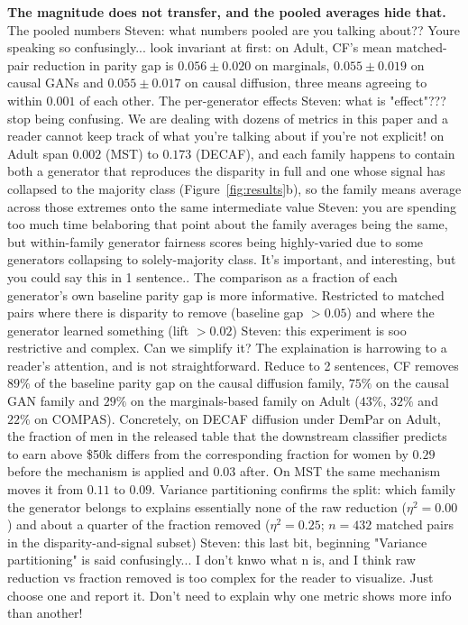 \documentclass{article}
\newcommand{\s}[1]{\textcolor{Dandelion}{Steven: #1}}
\begin{document}
\textbf{The magnitude does not transfer, and the pooled averages hide that.}
The pooled numbers \s{what numbers pooled are you talking about?? Youre speaking so confusingly...} look invariant at first: on Adult, CF's mean matched-pair
reduction in parity gap is $0.056 \pm 0.020$ on marginals, $0.055 \pm 0.019$
on causal GANs and $0.055 \pm 0.017$ on causal diffusion, three means
agreeing to within $0.001$ of each other. The per-generator effects \s{what is "effect"??? stop being confusing. We are dealing with dozens of metrics in this paper and a reader cannot keep track of what you're talking about if you're not explicit!} on Adult span $0.002$ (MST)
to $0.173$ (DECAF), and each family happens to contain both a generator
that reproduces the disparity in full and one whose signal has collapsed to
the majority class (Figure~\ref{fig:results}b), so the family means average
across those extremes onto the same intermediate value \s{you are spending too much time belaboring that point about the family averages being the same, but within-family generator fairness scores being highly-varied due to some generators collapsing to solely-majority class. It's important, and interesting, but you could say this in 1 sentence.}. The comparison as a fraction of
each generator's own baseline parity gap is more informative. Restricted to
matched pairs where there is disparity to remove (baseline gap $>0.05$) and
where the generator learned something (lift $>0.02$) \s{this experiment is soo restrictive and complex. Can we simplify it? The explaination is harrowing to a reader's attention, and is not straightforward. Reduce to 2 sentences}, CF removes $89\%$ of
the baseline parity gap on the causal diffusion family, $75\%$ on the causal
GAN family and $29\%$ on the marginals-based family on Adult ($43\%$, $32\%$
and $22\%$ on COMPAS). Concretely, on DECAF
diffusion under DemPar on Adult, the fraction of men in the released table
that the downstream classifier predicts to earn above \$50k differs from the
corresponding fraction for women by $0.29$ before the mechanism is applied
and $0.03$ after. On MST the same mechanism moves it from $0.11$ to $0.09$.
Variance partitioning confirms the split: which family the generator belongs
to explains essentially none of the raw reduction ($\eta^2 = 0.00$) and
about a quarter of the fraction removed ($\eta^2 = 0.25$; $n = 432$ matched
pairs in the disparity-and-signal subset) \s{this last bit, beginning "Variance partitioning" is said confusingly... I don't knwo what n is, and I think raw reduction vs fraction removed is too complex for the reader to visualize. Just choose one and report it. Don't need to explain why one metric shows more info than another!}
\end{document}
